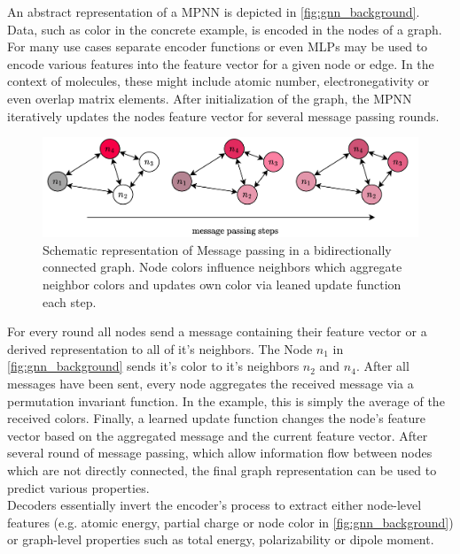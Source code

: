 An abstract representation of a MPNN is depicted in \autoref{fig:gnn_background}. Data, such as color in the concrete example, is encoded in the nodes of a graph. For many use cases separate encoder functions or even MLPs may be used to encode various features into the feature vector for a given node or edge. In the context of molecules, these might include atomic number, electronegativity or even overlap matrix elements. After initialization of the graph, the MPNN iteratively updates the nodes feature vector for several message passing rounds. 
\begin{figure}[h]
    \centering
    \includegraphics[width=\textwidth]{../fig/background/GNN.pdf}
    \caption[Schematic Message Passing Neural Net]{Schematic representation of Message passing in a bidirectionally connected graph. Node colors influence neighbors which aggregate neighbor colors and updates own color via leaned update function each step. }
    \label{fig:gnn_background}
\end{figure}
For every round all nodes send a message containing their feature vector or a derived representation to all of it's neighbors. The Node $n_1$ in \autoref{fig:gnn_background} sends it's color to it's neighbors $n_2$ and $n_4$. After all messages have been sent, every node aggregates the received message via a permutation invariant function. In the example, this is simply the average of the received colors. Finally, a learned update function changes the node's feature vector based on the aggregated message and the current feature vector. After several round of message passing, which allow information flow between nodes which are not directly connected, the final graph representation can be used to predict various properties.\\
Decoders essentially invert the encoder's process to extract either node-level features (e.g. atomic energy, partial charge or node color in \autoref{fig:gnn_background}) or graph-level properties such as total energy, polarizability or dipole moment.\\

